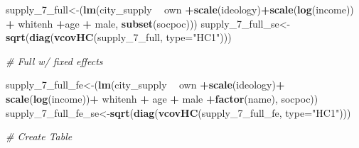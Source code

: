 \documentclass[]{article}
\newenvironment{Shaded}{\begin{snugshade}}{\end{snugshade}}
\newcommand{\CommentTok}[1]{\textcolor[rgb]{0.56,0.35,0.01}{\textit{#1}}}
\newcommand{\DataTypeTok}[1]{\textcolor[rgb]{0.13,0.29,0.53}{#1}}
\newcommand{\DecValTok}[1]{\textcolor[rgb]{0.00,0.00,0.81}{#1}}
\newcommand{\KeywordTok}[1]{\textcolor[rgb]{0.13,0.29,0.53}{\textbf{#1}}}
\newcommand{\NormalTok}[1]{#1}
\newcommand{\OperatorTok}[1]{\textcolor[rgb]{0.81,0.36,0.00}{\textbf{#1}}}
\newcommand{\StringTok}[1]{\textcolor[rgb]{0.31,0.60,0.02}{#1}}
\begin{document}
\begin{Shaded}
\begin{Highlighting}[]
{{{\NormalTok{supply_}\DecValTok{7}\NormalTok{_full<-(}\KeywordTok{lm}\NormalTok{(city_supply }\OperatorTok{~}\StringTok{ }\NormalTok{own }\OperatorTok{+}\KeywordTok{scale}\NormalTok{(ideology)}\OperatorTok{+}\KeywordTok{scale}\NormalTok{(}\KeywordTok{log}\NormalTok{(income)) }\OperatorTok{+}\StringTok{ }\NormalTok{whitenh  }\OperatorTok{+}\NormalTok{age }\OperatorTok{+}\StringTok{ }\NormalTok{male, }\KeywordTok{subset}\NormalTok{(socpoc)))}
\NormalTok{supply_}\DecValTok{7}\NormalTok{_full_se<-}\KeywordTok{sqrt}\NormalTok{(}\KeywordTok{diag}\NormalTok{(}\KeywordTok{vcovHC}\NormalTok{(supply_}\DecValTok{7}\NormalTok{_full, }\DataTypeTok{type=}\StringTok{"HC1"}\NormalTok{)))}

\CommentTok{# Full w/ fixed effects}

\NormalTok{supply_}\DecValTok{7}\NormalTok{_full_fe<-(}\KeywordTok{lm}\NormalTok{(city_supply }\OperatorTok{~}\StringTok{  }\NormalTok{own }\OperatorTok{+}\KeywordTok{scale}\NormalTok{(ideology)}\OperatorTok{+}\StringTok{ }\KeywordTok{scale}\NormalTok{(}\KeywordTok{log}\NormalTok{(income))}\OperatorTok{+}\StringTok{ }\NormalTok{whitenh  }\OperatorTok{+}\StringTok{ }\NormalTok{age }\OperatorTok{+}\StringTok{ }\NormalTok{male }\OperatorTok{+}\KeywordTok{factor}\NormalTok{(name), socpoc))}
\NormalTok{supply_}\DecValTok{7}\NormalTok{_full_fe_se<-}\KeywordTok{sqrt}\NormalTok{(}\KeywordTok{diag}\NormalTok{(}\KeywordTok{vcovHC}\NormalTok{(supply_}\DecValTok{7}\NormalTok{_full_fe, }\DataTypeTok{type=}\StringTok{"HC1"}\NormalTok{)))}

\CommentTok{# Create Table}

}}}
\end{Highlighting}
\end{Shaded}
\end{document}
